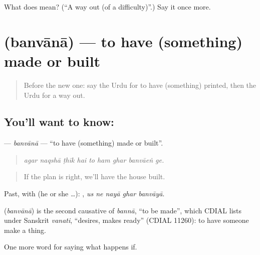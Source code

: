 \begin{tcolorbox}[breakable,colback=teal!4,colframe=teal!35!black,title={Before you move on}]
What does  mean? (\textquotedblleft{}A way out (of a difficulty)\textquotedblright{}.) Say it once more.
\end{tcolorbox}
\section[\texorpdfstring{\ur{بنوانا} (banvānā)}{بنوانا (banvānā)}]{ (banvānā) — to have (something) made or built}

\label{lesson:UR-C524-banvana}



\begin{quote}
Before the new one: say the Urdu for to have (something) printed, then the Urdu for a way out.
\end{quote}

\subsection*{You'll want to know: }
\textbf{} — \emph{banvānā} — \textquotedblleft{}to have (something) made or built\textquotedblright{}.

\begin{quote}
        
\end{quote}

\begin{quote}
\emph{agar naqshā ṭhīk hai to ham ghar banvāeṅ ge.}
\end{quote}

\begin{quote}
If the plan is right, we'll have the house built.
\end{quote}

Past, with  (he or she …):     , \emph{us ne nayā ghar banvāyā}.

\begin{cousinweb}
\textbf{} (\emph{banvānā}) is the second causative of \emph{bannā}, \textquotedblleft{}to be made\textquotedblright{}, which CDIAL lists under Sanskrit \emph{vanati}, \textquotedblleft{}desires, makes ready\textquotedblright{} (CDIAL 11260): to have someone make a thing.
\end{cousinweb}

\begin{grammarlens}[title={What you've built}]
One more word for saying what happens if.
\end{grammarlens}

